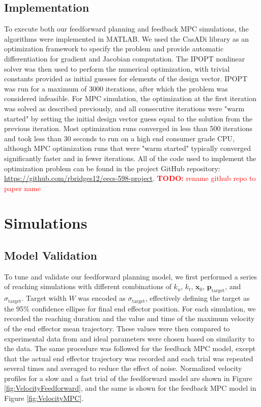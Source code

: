 \documentclass[letterpaper, 10pt, conference]{ieeeconf}
\newcommand{\todo}[1]{\textcolor{red}{\textbf{TODO:} #1}}
\begin{document}
\subsection{Implementation}
To execute both our feedforward planning and feedback MPC simulations, the algorithms were implemented in MATLAB. 
We used the CasADi library \cite{casadi} as an optimization framework to specify the problem and provide automatic differentiation for gradient and Jacobian computation. The IPOPT nonlinear solver was then used to perform the numerical optimization, with trivial constants provided as initial guesses for elements of the design vector. 
IPOPT was run for a maximum of 3000 iterations, after which the problem was considered infeasible. For MPC simulation, the optimization at the first iteration was solved as described previously, and all consecutive iterations were "warm started" by setting the initial design vector guess equal to the solution from the previous iteration. Most optimization runs converged in less than 500 iterations and took less than 30 seconds to run on a high end consumer grade CPU, although MPC optimization runs that were "warm started" typically converged significantly faster and in fewer iterations. All of the code used to implement the optimization problem can be found in the project GitHub repository: \href{https://github.com/rbridges12/eecs-598-project}{https://github.com/rbridges12/eecs-598-project}. \todo{rename github repo to paper name}

\section{Simulations}
\subsection{Model Validation}

To tune and validate our feedforward planning model, we first performed a series of reaching simulations with different combinations of $k_u$, $k_t$, $\mathbf{x}_0$, $\mathbf{p}_{\text{target}}$, and $\sigma_{\text{target}}$. Target width $W$ was encoded as $\sigma_{\text{target}}$, effectively defining the target as the 95\% confidence ellipse for final end effector position. For each simulation, we recorded the reaching duration and the value and time of the maximum velocity of the end effector mean trajectory. These values were then compared to experimental data from \cite{fitts_law_exp_data} and ideal parameters were chosen based on similarity to the data. The same procedure was followed for the feedback MPC model, except that the actual end effector trajectory was recorded and each trial was repeated several times and averaged to reduce the effect of noise.
Normalized velocity profiles for a slow and a fast trial of the feedforward model are shown in Figure \ref{fig:VelocityFeedforward}, and the same is shown for the feedback MPC model in Figure \ref{fig:VelocityMPC}.
\end{document}
